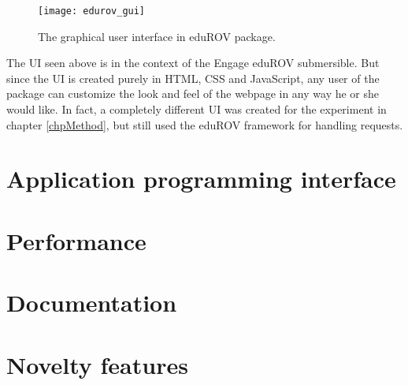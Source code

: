 \begin{figure}[h!]
    \centering
    \texttt{[image: edurov\_gui]}
    \caption{The graphical user interface in eduROV package.}
    \label{edurov_gui}
\end{figure}

The UI seen above is in the context of the Engage eduROV submersible. But since the UI is created purely in HTML, CSS and JavaScript, any user of the package can customize the look and feel of the webpage in any way he or she would like. In fact, a completely different UI was created for the experiment in chapter \ref{chpMethod}, but still used the eduROV framework for handling requests.

\section{Application programming interface}


\section{Performance}


\section{Documentation}




\section{Novelty features}

